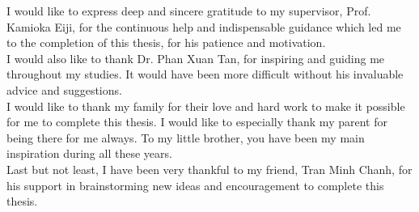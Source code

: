 \begin{acknowledgements}      

I would like to express deep and sincere gratitude to my supervisor, Prof. Kamioka Eiji, for the continuous help and indispensable guidance which led me to the completion of this thesis, for his patience and motivation.
\\

I would also like to thank Dr. Phan Xuan Tan, for inspiring and guiding me throughout my studies.
It would have been more difficult without his invaluable advice and suggestions.
\\

I would like to thank my family for their love and hard work to make it possible for me to complete this thesis.
I would like to especially thank my parent for being there for me always.
To my little brother, you have been my main inspiration during all these years.
\\

Last but not least, I have been very thankful to my friend, Tran Minh Chanh, for his support in brainstorming new ideas and encouragement to complete this thesis.


\end{acknowledgements}
